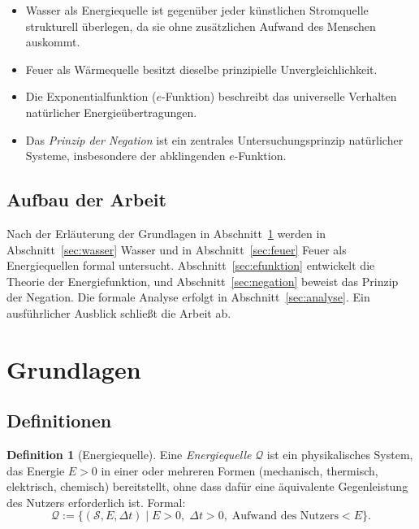 ﻿\documentclass[a4paper,12pt]{article}
\theoremstyle{definition}
\newtheorem{definition}{Definition}
\begin{document}
\begin{itemize}
    \item Wasser als Energiequelle ist gegen\"uber jeder k\"unstlichen Stromquelle
          strukturell \"uberlegen, da sie ohne zus\"atzlichen Aufwand des Menschen auskommt.
    \item Feuer als W\"armequelle besitzt dieselbe prinzipielle Unvergleichlichkeit.
    \item Die Exponentialfunktion ($e$-Funktion) beschreibt das universelle Verhalten
          nat\"urlicher Energie\"ubertragungen.
    \item Das \emph{Prinzip der Negation} ist ein zentrales Untersuchungsprinzip
          nat\"urlicher Systeme, insbesondere der abklingenden $e$-Funktion.
\end{itemize}

\subsection{Aufbau der Arbeit}

Nach der Erl\"auterung der Grundlagen in Abschnitt~\ref{sec:grundlagen} werden in
Abschnitt~\ref{sec:wasser} Wasser und in Abschnitt~\ref{sec:feuer} Feuer als
Energiequellen formal untersucht. Abschnitt~\ref{sec:efunktion} entwickelt die
Theorie der Energiefunktion, und Abschnitt~\ref{sec:negation} beweist das Prinzip
der Negation. Die formale Analyse erfolgt in Abschnitt~\ref{sec:analyse}. Ein
ausf\"uhrlicher Ausblick schlie\ss{}t die Arbeit ab.

\section{Grundlagen}
\label{sec:grundlagen}

\subsection{Definitionen}

\begin{definition}[Energiequelle]
    Eine \emph{Energiequelle} $\mathcal{Q}$ ist ein physikalisches System, das
    Energie $E > 0$ in einer oder mehreren Formen (mechanisch, thermisch, elektrisch,
    chemisch) bereitstellt, ohne dass daf\"ur eine \"aquivalente Gegenleistung des
    Nutzers erforderlich ist. Formal:
    \[
        \mathcal{Q} := \{(\mathcal{S}, E, \Delta t) \mid E > 0,\; \Delta t > 0,\;
        \text{Aufwand des Nutzers} < E\}.
    \]
\end{definition}
\end{document}
